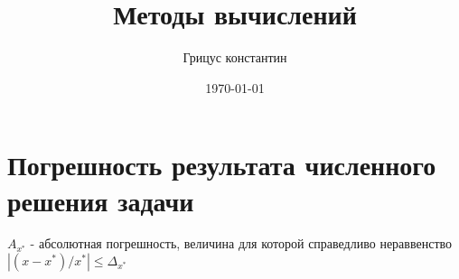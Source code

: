 \documentclass{article}
\title{Методы вычислений}
\author{Грицус константин}
\date{\today}
\begin{document}
\maketitle

\section{Погрешность результата численного решения задачи}

$ A_{x^{*}} $ - абсолютная погрешность, величина для которой справедливо
нераввенство $ |(x-x^{*})/x^{*}| \leq \Delta_{x^{*}} $
\end{document}
